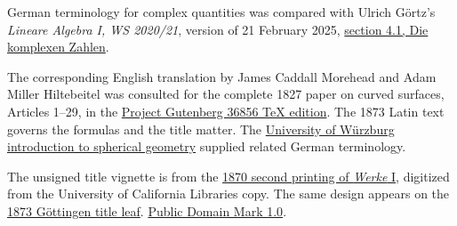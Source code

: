 \par\medskip\noindent German terminology for complex quantities was compared with Ulrich Görtz's \textit{Lineare Algebra I, WS 2020/21}, version of 21 February 2025, \href{https://math.ug/la1-ws2021/sect0017.html}{section 4.1, Die komplexen Zahlen}.
\par\medskip\noindent The corresponding English translation by James Caddall Morehead and Adam Miller Hiltebeitel was consulted for the complete 1827 paper on curved surfaces, Articles 1--29, in the \href{https://www.gutenberg.org/ebooks/36856}{Project Gutenberg 36856 TeX edition}. The 1873 Latin text governs the formulas and the title matter. The \href{https://www.didaktik.mathematik.uni-wuerzburg.de/projekt/mathei/kugelgeo/einfuehr.html}{University of Würzburg introduction to spherical geometry} supplied related German terminology.
\par\medskip\noindent The unsigned title vignette is from the \href{https://commons.wikimedia.org/w/index.php?oldid=1179960952}{1870 second printing of \textit{Werke} I}, digitized from the University of California Libraries copy. The same design appears on the \href{https://gdz.sub.uni-goettingen.de/id/PPN236005081}{1873 Göttingen title leaf}. \href{https://creativecommons.org/publicdomain/mark/1.0/}{Public Domain Mark 1.0}.
\par\endgroup\clearpage
